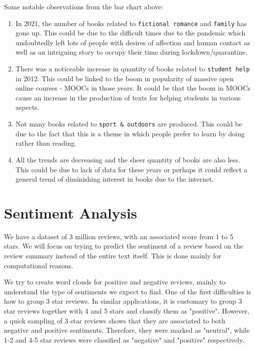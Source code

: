 \documentclass[a4paper,10pt, openright]{article}
\begin{document}
Some notable observations from the bar chart above:
\begin{enumerate}
\item In 2021, the number of books related to \texttt{fictional romance} and \texttt{family} has gone up. This could be due to the difficult times due to the pandemic which undoubtedly left lots of people with desires of affection and human contact\cite{secondbib} as well as an intriguing story to occupy their time during lockdown/quarantine. 
\item There was a noticeable increase in quantity of books related to \texttt{student help} in 2012. This could be linked to the boom in popularity of massive open online courses - MOOCs in those years\cite{thirdbib}. It could be that the boom in MOOCs cause an increase in the production of texts for helping students in various aspects.  
\item Not many books related to \texttt{sport \& outdoors} are produced. This could be due to the fact that this is a theme in which people prefer to learn by doing rather than reading. 
\item All the trends are decreasing and the sheer quantity of books are also less. This could be due to lack of data for these years or perhaps it could reflect a general trend of diminishing interest in books due to the internet. 
\end{enumerate}

\section{Sentiment Analysis }


We have a dataset of 3 million reviews, with an associated score from 1 to 5 stars. We will focus on trying to predict the sentiment of a review based on the review summary instead of the entire text itself. This is done mainly for computational reasons. 

We try to create word clouds for positive and negative reviews, mainly to understand the type of sentiments we expect to find. One of the first difficulties is how to group 3 star reviews. In similar applications, it is customary to group 3 star reviews together with 4 and 5 stars and classify them as "positive". However, a quick sampling of 3 star reviews shows that they are associated to both negative and positive sentiments. Therefore, they were marked as "neutral", while 1-2 and 4-5 star reviews were classified as "negative" and "positive" respectively. 
\end{document}
